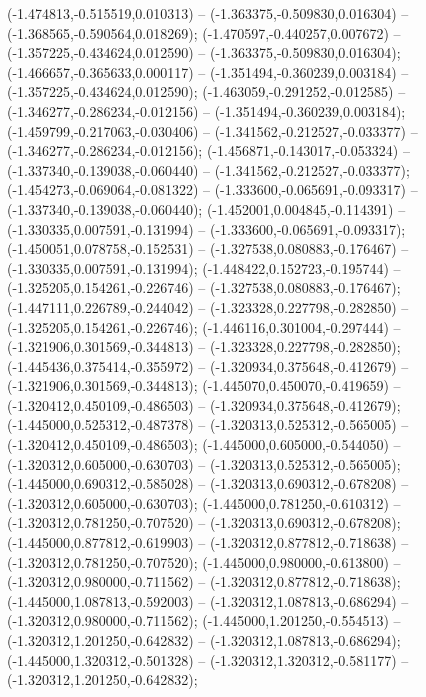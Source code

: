  (-1.474813,-0.515519,0.010313) -- (-1.363375,-0.509830,0.016304) -- (-1.368565,-0.590564,0.018269);
 (-1.470597,-0.440257,0.007672) -- (-1.357225,-0.434624,0.012590) -- (-1.363375,-0.509830,0.016304);
 (-1.466657,-0.365633,0.000117) -- (-1.351494,-0.360239,0.003184) -- (-1.357225,-0.434624,0.012590);
 (-1.463059,-0.291252,-0.012585) -- (-1.346277,-0.286234,-0.012156) -- (-1.351494,-0.360239,0.003184);
 (-1.459799,-0.217063,-0.030406) -- (-1.341562,-0.212527,-0.033377) -- (-1.346277,-0.286234,-0.012156);
 (-1.456871,-0.143017,-0.053324) -- (-1.337340,-0.139038,-0.060440) -- (-1.341562,-0.212527,-0.033377);
 (-1.454273,-0.069064,-0.081322) -- (-1.333600,-0.065691,-0.093317) -- (-1.337340,-0.139038,-0.060440);
 (-1.452001,0.004845,-0.114391) -- (-1.330335,0.007591,-0.131994) -- (-1.333600,-0.065691,-0.093317);
 (-1.450051,0.078758,-0.152531) -- (-1.327538,0.080883,-0.176467) -- (-1.330335,0.007591,-0.131994);
 (-1.448422,0.152723,-0.195744) -- (-1.325205,0.154261,-0.226746) -- (-1.327538,0.080883,-0.176467);
 (-1.447111,0.226789,-0.244042) -- (-1.323328,0.227798,-0.282850) -- (-1.325205,0.154261,-0.226746);
 (-1.446116,0.301004,-0.297444) -- (-1.321906,0.301569,-0.344813) -- (-1.323328,0.227798,-0.282850);
 (-1.445436,0.375414,-0.355972) -- (-1.320934,0.375648,-0.412679) -- (-1.321906,0.301569,-0.344813);
 (-1.445070,0.450070,-0.419659) -- (-1.320412,0.450109,-0.486503) -- (-1.320934,0.375648,-0.412679);
 (-1.445000,0.525312,-0.487378) -- (-1.320313,0.525312,-0.565005) -- (-1.320412,0.450109,-0.486503);
 (-1.445000,0.605000,-0.544050) -- (-1.320312,0.605000,-0.630703) -- (-1.320313,0.525312,-0.565005);
 (-1.445000,0.690312,-0.585028) -- (-1.320313,0.690312,-0.678208) -- (-1.320312,0.605000,-0.630703);
 (-1.445000,0.781250,-0.610312) -- (-1.320312,0.781250,-0.707520) -- (-1.320313,0.690312,-0.678208);
 (-1.445000,0.877812,-0.619903) -- (-1.320312,0.877812,-0.718638) -- (-1.320312,0.781250,-0.707520);
 (-1.445000,0.980000,-0.613800) -- (-1.320312,0.980000,-0.711562) -- (-1.320312,0.877812,-0.718638);
 (-1.445000,1.087813,-0.592003) -- (-1.320312,1.087813,-0.686294) -- (-1.320312,0.980000,-0.711562);
 (-1.445000,1.201250,-0.554513) -- (-1.320312,1.201250,-0.642832) -- (-1.320312,1.087813,-0.686294);
 (-1.445000,1.320312,-0.501328) -- (-1.320312,1.320312,-0.581177) -- (-1.320312,1.201250,-0.642832);
